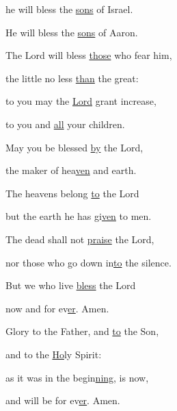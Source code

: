 he will bless the \uline{sons} of Israel.~\GreStar{}~\nopagebreak

He will bless the \uline{sons} of Aaron.



\noindent The Lord will bless \uline{those} who fear him,~\GreStar{}~\nopagebreak

the little no less \uline{than} the great:

\noindent to you may the \uline{Lord} grant increase,~\GreStar{}~\nopagebreak

to you and \uline{all} your children.



\noindent May you be blessed \uline{by} the Lord,~\GreStar{}~\nopagebreak

the maker of hea\uline{ven} and earth.

\noindent The heavens belong \uline{to} the Lord~\GreStar{}~\nopagebreak

but the earth he has gi\uline{ven} to men.



\noindent The dead shall not \uline{praise} the Lord,~\GreStar{}~\nopagebreak

nor those who go down in\uline{to} the silence.

\noindent But we who live \uline{bless} the Lord~\GreStar{}~\nopagebreak

now and for ev\uline{er}. Amen.



\noindent Glory to the Father, and \uline{to} the Son,~\GreStar{}~\nopagebreak

and to the \uline{Ho}ly Spirit:

\noindent as it was in the begin\uline{ning}, is now,~\GreStar{}~\nopagebreak

and will be for ev\uline{er}. Amen.

